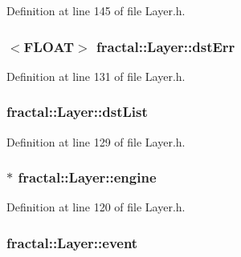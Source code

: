 Definition at line 145 of file Layer.\+h.

\hypertarget{classfractal_1_1Layer_a299f9cb54bb1bc123a78e2fe6486b6c2}{
\subsubsection[{dst\+Err}]{$<${\bf F\+L\+O\+A\+T}$>$ fractal\+::\+Layer\+::dst\+Err\hspace{0.3cm}{\ttfamily [protected]}}}\label{classfractal_1_1Layer_a299f9cb54bb1bc123a78e2fe6486b6c2}


Definition at line 131 of file Layer.\+h.

\hypertarget{classfractal_1_1Layer_ac0625856995bf53809a52fc1266bf706}{
\subsubsection[{dst\+List}]{ fractal\+::\+Layer\+::dst\+List\hspace{0.3cm}{\ttfamily [protected]}}}\label{classfractal_1_1Layer_ac0625856995bf53809a52fc1266bf706}


Definition at line 129 of file Layer.\+h.

\hypertarget{classfractal_1_1Layer_a95f0129c9d79e1292d7d1e5732d70e5e}{
\subsubsection[{engine}]{$\ast$ fractal\+::\+Layer\+::engine\hspace{0.3cm}{\ttfamily [protected]}}}\label{classfractal_1_1Layer_a95f0129c9d79e1292d7d1e5732d70e5e}


Definition at line 120 of file Layer.\+h.

\hypertarget{classfractal_1_1Layer_a6f4b1783eae158a746c0f2d43114cba3}{
\subsubsection[{event}]{ fractal\+::\+Layer\+::event\hspace{0.3cm}{\ttfamily [protected]}}}\label{classfractal_1_1Layer_a6f4b1783eae158a746c0f2d43114cba3}


